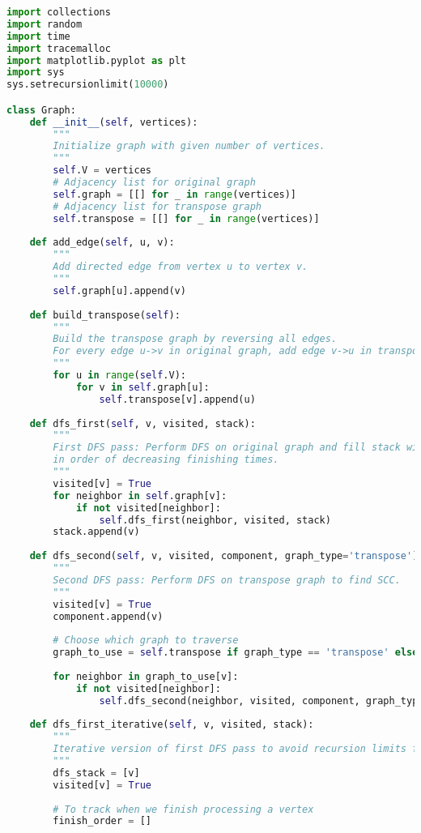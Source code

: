 \documentclass{book}
\theoremstyle{definition}
\begin{document}
\begin{lstlisting}[language=Python, caption=Graph Class Structure]
import collections
import random
import time
import tracemalloc
import matplotlib.pyplot as plt
import sys
sys.setrecursionlimit(10000)

class Graph:
    def __init__(self, vertices):
        """
        Initialize graph with given number of vertices.
        """
        self.V = vertices
        # Adjacency list for original graph
        self.graph = [[] for _ in range(vertices)]
        # Adjacency list for transpose graph
        self.transpose = [[] for _ in range(vertices)]
    
    def add_edge(self, u, v):
        """
        Add directed edge from vertex u to vertex v.
        """
        self.graph[u].append(v)
    
    def build_transpose(self):
        """
        Build the transpose graph by reversing all edges.
        For every edge u->v in original graph, add edge v->u in transpose.
        """
        for u in range(self.V):
            for v in self.graph[u]:
                self.transpose[v].append(u)
    
    def dfs_first(self, v, visited, stack):
        """
        First DFS pass: Perform DFS on original graph and fill stack with vertices
        in order of decreasing finishing times.
        """
        visited[v] = True
        for neighbor in self.graph[v]:
            if not visited[neighbor]:
                self.dfs_first(neighbor, visited, stack)
        stack.append(v)
    
    def dfs_second(self, v, visited, component, graph_type='transpose'):
        """
        Second DFS pass: Perform DFS on transpose graph to find SCC.
        """
        visited[v] = True
        component.append(v)
        
        # Choose which graph to traverse
        graph_to_use = self.transpose if graph_type == 'transpose' else self.graph
        
        for neighbor in graph_to_use[v]:
            if not visited[neighbor]:
                self.dfs_second(neighbor, visited, component, graph_type)
    
    def dfs_first_iterative(self, v, visited, stack):
        """
        Iterative version of first DFS pass to avoid recursion limits for large graphs.
        """
        dfs_stack = [v]
        visited[v] = True
        
        # To track when we finish processing a vertex
        finish_order = []
        

\end{lstlisting}
\end{document}
